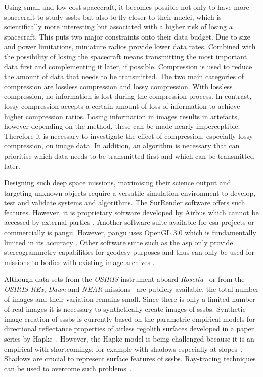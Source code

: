 Using small and low-cost spacecraft, it becomes possible not only to have more spacecraft to study \glspl{sssb} but also to fly closer to their nuclei, which is scientifically more interesting but associated with a higher risk of losing a spacecraft. This puts two major constraints onto their data budget. Due to size and power limitations, miniature radios provide lower data rates. Combined with the possibility of losing the spacecraft means transmitting the most important data first and complementing it later, if possible. Compression is used to reduce the amount of data that needs to be transmitted. The two main categories of compression are lossless compression and lossy compression. With lossless compression, no information is lost during the compression process. In contrast, lossy compression accepts a certain amount of loss of information to achieve higher compression ratios. Losing information in images results in artefacts, however depending on the method, these can be made nearly imperceptible. Therefore it is necessary to investigate the effect of compression, especially lossy compression, on image data. In addition, an algorithm is necessary that can prioritise which data needs to be transmitted first and which can be transmitted later.

Designing such deep space missions, maximising their science output and targeting unknown objects require a versatile simulation environment to develop, test and validate systems and algorithms. The SurRender software offers such features. However, it is proprietary software developed by Airbus which cannot be accessed by external parties \cite{Brochard2018ScientificSoftware}. Another software suite available for \gls{esa} projects or commercially is \gls{pangu}. However, \gls{pangu} uses OpenGL 3.0 which is fundamentally limited in its accuracy \cite{Martin2019PlanetaryPANGU}. Other software suite such as the \gls{asp} only provide stereogrammetry capabilities for geodesy purposes and thus can only be used for missions to bodies with existing image archives \cite{Beyer2018TheData}.

Although data sets from the \textit{OSIRIS} instrument aboard \textit{Rosetta}~\cite{osirisArchive} or from the \textit{OSIRIS-REx}, \textit{Dawn} and \textit{NEAR} missions~\cite{palmer2014small} are publicly available, the total number of images and their variation remains small. Since there is only a limited number of real images it is necessary to synthetically create images of \glspl{sssb}. Synthetic image creation of \glspl{sssb} is currently based on the parametric empirical models for directional reflectance properties of airless regolith surfaces developed in a paper series by Hapke~\cite{Hapke1981BidirectionalTheory, hapke1981bidirectional2, Hapke1984BidirectionalRoughness, Hapke1986BidirectionalEffect, Hapke2002BidirectionalScattering, Hapke2008BidirectionalPorosity, Hapke2012Bidirectional7}. However, the Hapke model is being challenged because it is an empirical with shortcomings, for example with shadows especially at slopes~\cite{shkuratov2012critical}. Shadows are crucial to represent surface features of \glspl{sssb}. Ray-tracing techniques can be used to overcome such problems~\cite{shkuratov2012critical, lafortune1996mathematical}.

